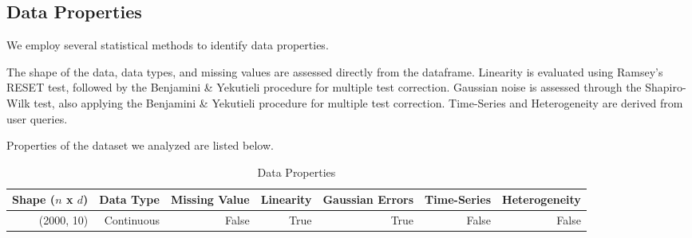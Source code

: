 \documentclass{article}
\begin{document}
\begin{table}[H]
    \centering
    \caption{Dataset Preview}
\end{table}

\subsection{Data Properties}
We employ several statistical methods to identify data properties.

The shape of the data, data types, and missing values are assessed directly from the dataframe. Linearity is evaluated using Ramsey’s RESET test, followed by the Benjamini \& Yekutieli procedure for multiple test correction. Gaussian noise is assessed through the Shapiro-Wilk test, also applying the Benjamini \& Yekutieli procedure for multiple test correction. Time-Series and Heterogeneity are derived from user queries.

Properties of the dataset we analyzed are listed below.

\begin{table}[H]
    \centering
    \caption{Data Properties}
    \begin{tabular}{rrrrrrr}
    \toprule
    Shape ($n$ x $d$) & Data Type & Missing Value & Linearity & Gaussian Errors & Time-Series & Heterogeneity \\
    \midrule
    (2000, 10)   & Continuous & False & True & True & False & False \\
    \bottomrule
    \end{tabular}
\end{table}
\end{document}
